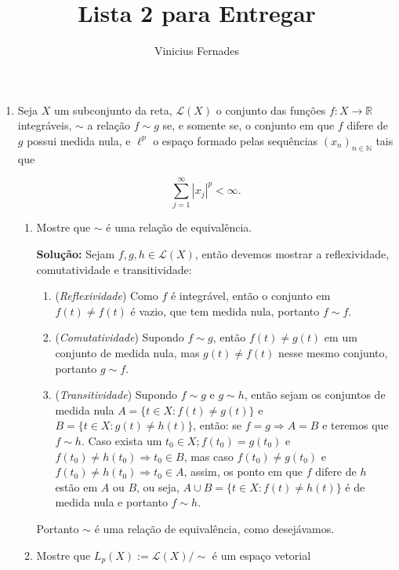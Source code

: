 \documentclass{article}
\begin{document}
	
	\title{Lista 2 para Entregar}
	\author{Vinicius Fernades}
	
	\maketitle
	
	\begin{enumerate}
		\item Seja $X$ um subconjunto da reta, $\mathcal{L}(X)$ o conjunto das funções $f:X \to \mathbb{R}$ integráveis, $\sim$ a relação $f \sim g$ se, e somente se, o conjunto em que $f$ difere de $g$ possui medida nula, e $\ell^{p}$ o espaço formado pelas sequências $(x_n)_{n \in \mathbb{N}}$ tais que
		
		$$
		\sum \limits_{j=1}^{\infty} |x_j|^{p} < \infty.
		$$
		
		\begin{enumerate}
			\item Mostre que $\sim$ é uma relação de equivalência.
			
			\textbf{Solução:} Sejam $f, g, h \in \mathcal{L}(X)$, então devemos mostrar a reflexividade, comutatividade e transitividade:
			\begin{enumerate}
				\item (\textit{Reflexividade}) Como $f$ é integrável, então o conjunto em $f(t) \neq f(t)$ é vazio, que tem medida nula, portanto $f \sim f$.
				
				\item (\textit{Comutatividade}) Supondo $f \sim g$, então $f(t) \neq g(t)$ em um conjunto de medida nula, mas $g(t) \neq f(t)$ nesse mesmo conjunto, portanto $g \sim f$. 
				
				\item (\textit{Transitividade}) Supondo $f \sim g$ e $g \sim h$, então sejam os conjuntos de medida nula $A=\{t \in X: f(t) \neq g(t)\}$ e $B=\{t \in X: g(t) \neq h(t)\}$, então: se $f = g \Rightarrow A=B$ e teremos que $f \sim h$. Caso exista um $t_0 \in X; f(t_0) = g(t_0)$ e $f(t_0) \neq h(t_0) \Rightarrow t_0 \in B$, mas caso  $f(t_0) \neq g(t_0)$ e $f(t_0) \neq h(t_0) \Rightarrow t_0 \in A$, assim, os ponto em que $f$ difere de $h$ estão em $A$ ou $B$, ou seja, $A\cup B=\{ t \in X: f(t) \neq h(t) \}$ é de medida nula e portanto $f \sim h$.  
			\end{enumerate}
			Portanto $\sim$ é uma relação de equivalência, como desejávamos. 
			
			
			\item Mostre que $L_{p}(X) := \mathcal{L}(X)/\sim$ é um espaço vetorial
			

\end{enumerate}
\end{enumerate}
\end{document}
